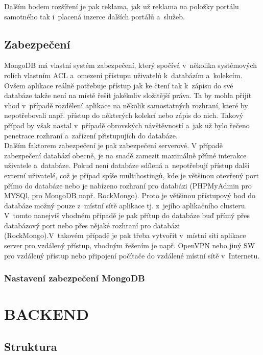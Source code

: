 \documentclass[a4paper,12pt,twoside,BCOR=10mm]{article}
\newcommand{\upc}[1]{\uppercase{#1}} %
\begin{document}
Dalším bodem rozšíření je pak reklama, jak už reklama na položky portálu samotného tak i~placená inzerce dalších portálů a~služeb.\\

\subsection{Zabezpečení}
MongoDB má vlastní systém zabezpečení, který spočívá v~několika systémových rolích vlastním ACL a~omezení přístupu uživatelů k~databázím a~kolekcím. Ovšem aplikace reálně potřebuje přístup jak ke čtení tak k~zápisu do své databáze takže není na místě řešit jakékoliv složitější práva. Ta by mohla přijít vhod v~případě rozdělení aplikace na několik samostatných rozhraní, které by nepotřebovali např. přístup do některých kolekcí nebo zápis do nich. Takový případ by však nastal v~případě obrovských návštěvností a~jak už bylo řečeno penetrace rozhraní a~zařízení přistupujích do databáze.\\

Dalším faktorem zabezpečení je pak zabezpečení serverové. V případě zabezpečení databází obecně, je na snadě zamezit maximálně přímé interakce uživatele a~databáze. Pokud není databáze sdílená a~nepotřebují přístup další externí uživatelé, což je případ spíše multihostingů, kde je většinou otevřený port přímo do databáze nebo je nabízeno rozhraní pro databázi (PHPMyAdmin pro MYSQl, pro MongoDB např. RockMongo). Proto je většinou přístupový bod do databáze možný pouze z~místní sítě aplikace tj. z~jejího aplikačního clusteru. V~tomto nanejvíš vhodném případě je pak přítup do databáze buď přímý přes databázový port nebo přes nějaké rozhraní pro databázi (RockMongo).V~takovém případě je pak třeba vytvořit v~místní síti aplikace server pro vzdálený přístup, vhodným řešením je např. OpenVPN nebo jiný SW pro vzdálený přístup nebo připojení počítače do vzdálené místní sítě v~Internetu.

\subsubsection{Nastavení zabezpečení MongoDB}

\section{\upc{Backend}}\label{sec:backend}
\subsection{Struktura}
\end{document}
